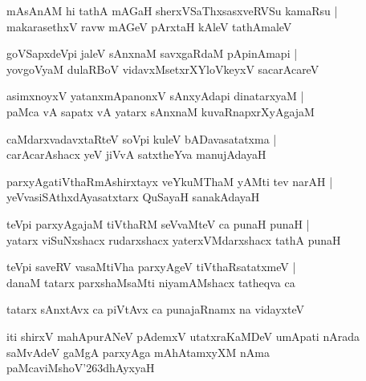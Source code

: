 \documentclass[twoside,12pt,openright]{book}
\def\S{\char'263}
\newcounter{shloka}[chapter]
\begin{document}
\begin{shloka}%
mAsAnAM hi tathA mAGaH sherxVSaThxsasxveRVSu kamaRsu |\\
makarasethxV ravw mAGeV pArxtaH kAleV tathAmaleV 
\end{shloka}

\begin{shloka}%
goVSapxdeVpi jaleV sAnxnaM savxgaRdaM pApinAmapi |\\
yovgoVyaM dulaRBoV vidavxMsetxrXYloVkeyxV sacarAcareV
\end{shloka}

\begin{shloka}%
asimxnoyxV yatanxmApanonxV sAnxyAdapi dinatarxyaM |\\
paMca vA sapatx vA yatarx sAnxnaM kuvaRnapxrXyAgajaM
\end{shloka}

\begin{shloka}%
caMdarxvadavxtaRteV soVpi kuleV bADavasatatxma |\\
carAcarAshacx yeV jiVvA satxtheYva manujAdayaH 
\end{shloka}

\begin{shloka}%
parxyAgatiVthaRmAshirxtayx veYkuMThaM yAMti tev narAH |\\
yeVvasiSAthxdAyasatxtarx QuSayaH sanakAdayaH
\end{shloka}

\begin{shloka}%
teVpi parxyAgajaM tiVthaRM seVvaMteV ca punaH punaH |\\
yatarx viSuNxshacx rudarxshacx yaterxVMdarxshacx tathA punaH 
\end{shloka}

\begin{shloka}%
teVpi saveRV vasaMtiVha parxyAgeV tiVthaRsatatxmeV |\\
danaM tatarx parxshaMsaMti niyamAMshacx tatheqva ca 
\end{shloka}

\begin{shloka}%
tatarx sAnxtAvx ca piVtAvx ca punajaRnamx na vidayxteV 
\end{shloka}

\begin{center}
iti shirxV mahApurANeV pAdemxV utatxraKaMDeV  umApati nArada saMvAdeV  
gaMgA parxyAga mAhAtamxyXM nAma paMcaviMshoV\S dhAyxyaH 
\end{center}
\end{document}
